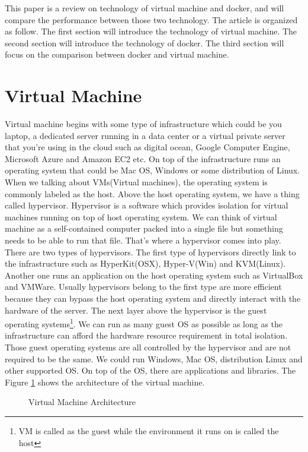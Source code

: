 \documentclass{sig-alternate}
\begin{document}
This paper is a review on technology of virtual machine and docker, and will compare the performance between those two technology. The article is organized as follow. The first section will introduce the technology of virtual machine. The second section will introduce the technology of docker. The third section will focus on the comparison between docker and virtual machine. 

\section{Virtual Machine}
Virtual machine begins with some type of infrastructure which could be you laptop, a dedicated server running in a data center or a virtual private server that you're using in the cloud such as digital ocean, Google Computer Engine, Microsoft Azure and Amazon EC2 etc. On top of the infrastructure runs an operating system that could be Mac OS, Windows or some distribution of Linux. When we talking about VMs(Virtual machines), the operating system is commonly labeled as the host. Above the host operating system, we have a thing called hypervisor. Hypervisor is a software which provides isolation for virtual machines running on top of host operating system. We can think of virtual machine as a self-contained computer packed into a single file but something needs to be able to run that file. That's where a hypervisor comes into play. There are two types of hypervisors. The first type of hypervisors directly link to the infrastructure such as HyperKit(OSX), Hyper-V(Win) and KVM(Linux). Another one runs an application on the host operating system such as VirtualBox and VMWare. Usually hypervisors belong to the first type are more efficient because they can bypass the host operating system and directly interact with the hardware of the server. The next layer above the hypervisor is the guest operating systems\footnote{VM is called as the guest while the environment it runs on is called the host}. We can run as many guest OS as possible as long as the infrastructure can afford the hardware resource requirement in total isolation. Those guest operating systems are all controlled by the hypervisor and are not required to be the same. We could run Windows, Mac OS, distribution Linux and other supported OS.  On top of the OS, there are applications and libraries. The Figure \ref{fig:vma} shows the architecture of the virtual machine. 

\begin{figure}[ht]
\centering
{}
\caption{Virtual Machine Architecture}
\label{fig:vma}
\vskip -6pt
\end{figure}
\end{document}
